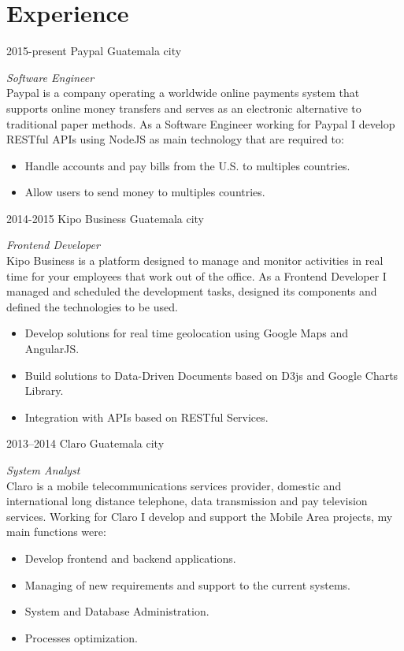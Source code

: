 \documentclass[]{friggeri-cv} %
\begin{document}
\section{Experience}
\begin{entrylist}
\entry
	{2015-present}
	{Paypal}
	{Guatemala city}
	{
		\emph{Software Engineer} \\
		Paypal is a company operating a worldwide online payments system that supports online money transfers
		and serves as an electronic alternative to traditional paper methods. As a Software Engineer working for
		Paypal I develop RESTful APIs using NodeJS as main technology that are required to:

		\begin{itemize}
			\item Handle accounts and pay bills from the U.S. to multiples countries.
			\item Allow users to send money to multiples countries.
		\end{itemize}
	}

\entry
	{2014-2015}
	{Kipo Business}
	{Guatemala city}
	{
		\emph{Frontend Developer} \\
		Kipo Business is a platform designed to manage and monitor activities in real time for your employees that
		work out of the office. As a Frontend Developer I managed and scheduled the development tasks, designed its 
		components and defined the technologies to be used.

		\begin{itemize}
			\item Develop solutions for real time geolocation using Google Maps and AngularJS.
			\item Build solutions to Data-Driven Documents based on D3js and Google Charts Library.
			\item Integration with APIs based on RESTful Services.
		\end{itemize}
	}
	
\entry
	{2013--2014}
	{Claro}
	{Guatemala city}
	{
		\emph{System Analyst} \\
		Claro is a mobile telecommunications services provider, domestic and international
		long distance telephone, data transmission and pay television services. Working for Claro I develop and support 
		the Mobile Area projects, my main functions were:

		\begin{itemize}
			\item Develop frontend and backend applications.
			\item Managing of new requirements and support to the current systems.
			\item System and Database Administration.
			\item Processes optimization.
		\end{itemize}
	}

\end{entrylist}
\end{document}
